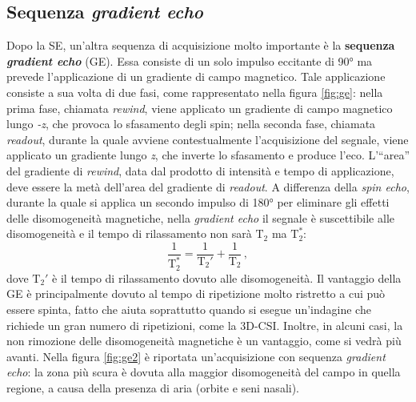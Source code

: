 \documentclass{report}
\newcommand{\virgolette}[1]{``#1''}
\newcommand{\figref}[1]{figura \ref{#1}}
\numberwithin{equation}{section}
\numberwithin{figure}{section}
\begin{document}
\subsection{Sequenza \textit{gradient echo}}
Dopo la SE, un'altra sequenza di acquisizione molto importante è la  \textbf{sequenza \textit{gradient echo}} (GE). Essa consiste di un solo impulso eccitante di 90° ma prevede l'applicazione di un gradiente di campo magnetico. Tale applicazione consiste a sua volta di due fasi, come rappresentato nella \figref{fig:ge}: nella prima fase, chiamata \textit{rewind}, viene applicato un gradiente di campo magnetico lungo \textit{-z}, che provoca lo sfasamento degli spin; nella seconda fase, chiamata \textit{readout}, durante la quale avviene contestualmente l'acquisizione del segnale, viene applicato un gradiente lungo \textit{z}, che inverte lo sfasamento e produce l'eco. L'\virgolette{area} del gradiente di \textit{rewind}, data dal prodotto di intensità e tempo di applicazione, deve essere la metà dell'area del gradiente di \textit{readout}. A differenza della \textit{spin echo}, durante la quale si applica un secondo impulso di 180° per eliminare gli effetti delle disomogeneità magnetiche, nella \textit{gradient echo} il segnale è suscettibile alle disomogeneità e il tempo di rilassamento non sarà $\mathrm{T_2}$ ma $\mathrm{T}_2^*$:
\begin{equation}
    \frac{1}{\mathrm{T}_2^*} = \frac{1}{\mathrm{T}_2'} + \frac{1}{\mathrm{T_2}}\,,
    \label{t2}
\end{equation}
dove $\mathrm{T}_2'$ è il tempo di rilassamento dovuto alle disomogeneità. Il vantaggio della GE è principalmente dovuto al tempo di ripetizione molto ristretto a cui può essere spinta, fatto che aiuta soprattutto quando si esegue un'indagine che richiede un gran numero di ripetizioni, come la 3D-CSI. Inoltre, in alcuni casi, la non rimozione delle disomogeneità magnetiche è un vantaggio, come si vedrà più avanti. Nella \figref{fig:ge2} è riportata un'acquisizione con sequenza \textit{gradient echo}: la zona più scura è dovuta alla maggior disomogeneità del campo in quella regione, a causa della presenza di aria (orbite e seni nasali).
\end{document}
